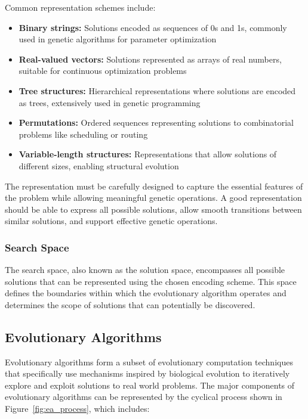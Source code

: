 \documentclass[a4paper,12pt]{article}
\begin{document}
Common representation schemes include:
\begin{itemize}
   \item \textbf{Binary strings:} Solutions encoded as sequences of 0s and 1s, commonly used in genetic algorithms for parameter optimization
   \item \textbf{Real-valued vectors:} Solutions represented as arrays of real numbers, suitable for continuous optimization problems
   \item \textbf{Tree structures:} Hierarchical representations where solutions are encoded as trees, extensively used in genetic programming
   \item \textbf{Permutations:} Ordered sequences representing solutions to combinatorial problems like scheduling or routing
   \item \textbf{Variable-length structures:} Representations that allow solutions of different sizes, enabling structural evolution
\end{itemize}

The representation must be carefully designed to capture the essential features of the problem while allowing meaningful genetic operations. 
A good representation should be able to express all possible solutions, allow smooth transitions between similar solutions, 
and support effective genetic operations.~\cite{ECintro}

\subsubsection{Search Space}
The search space, also known as the solution space, encompasses all possible solutions that can be represented using the chosen encoding scheme. 
This space defines the boundaries within which the evolutionary algorithm operates and determines the scope of solutions that can potentially be discovered.~\cite{ECintro}

\subsection{Evolutionary Algorithms}
Evolutionary algorithms form a subset of evolutionary computation techniques that specifically use mechanisms inspired by biological evolution 
to iteratively explore and exploit solutions to real world problems. The major components of evolutionary algorithms can be represented 
by the cyclical process shown in Figure~\ref{fig:ea_process}, which includes:
\end{document}
